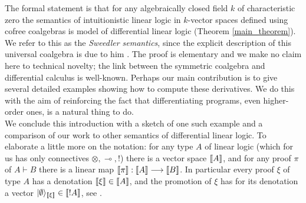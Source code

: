 \documentclass[english,letter paper,12pt,reqno]{article}
\DeclarePairedDelimiter\ket{\lvert}{\rangle}
\theoremstyle{example}
\begin{document}
The formal statement is that for any algebraically closed field $k$ of characteristic zero the semantics of intuitionistic linear logic in $k$-vector spaces defined using cofree coalgebras is model of differential linear logic (Theorem \ref{main_theorem}). We refer to this as the \emph{Sweedler semantics}, since the explicit description of this universal coalgebra is due to him  \cite{sweedler,murfet_ll}. The proof is elementary and we make no claim here to technical novelty; the link between the symmetric coalgebra and differential calculus is well-known. Perhaps our main contribution is to give several detailed examples showing how to compute these derivatives. We do this with the aim of reinforcing the fact that differentiating programs, even higher-order ones, is a natural thing to do.
\\

We conclude this introduction with a sketch of one such example and a comparison of our work to other semantics of differential linear logic. To elaborate a little more on the notation: for any type $A$ of linear logic (which for us has only connectives $\otimes, \multimap, !$) there is a vector space $\llbracket A \rrbracket$, and for any proof $\pi$ of $A \vdash B$ there is a linear map $\llbracket \pi \rrbracket: \llbracket A \rrbracket \longrightarrow \llbracket B \rrbracket$. In particular every proof $\xi$ of type $A$ has a denotation $\llbracket \xi \rrbracket \in \llbracket A \rrbracket$, and the promotion of $\xi$ has for its denotation a vector $\ket{\emptyset}_{\den{\xi}} \in \den{!A}$, see \cite[\S 5.3]{murfet_ll}.
\end{document}
